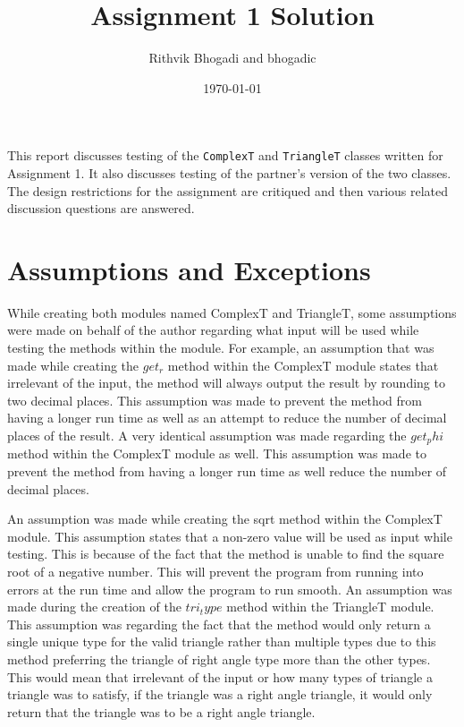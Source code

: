 \documentclass[12pt]{article}
\title{Assignment 1 Solution}
\author{Rithvik Bhogadi and bhogadic}
\date{\today}
\begin{document}
\maketitle

This report discusses testing of the \verb|ComplexT| and \verb|TriangleT|
classes written for Assignment 1. It also discusses testing of the partner's
version of the two classes. The design restrictions for the assignment
are critiqued and then various related discussion questions are answered.

\section{Assumptions and Exceptions} \label{AssumptAndExcept}

While creating both modules named ComplexT and TriangleT, some assumptions were made on behalf of the author regarding what input will be used while testing
the methods within the module. For example, an assumption that was made while creating the $get_r$ method within the ComplexT module states that irrelevant of
the input, the method will always output the result by rounding to two decimal places. This assumption was made to prevent the method from having a longer
run time as well as an attempt to reduce the number of decimal places of the result. A very identical assumption was made regarding the $get_phi$ method
within the ComplexT module as well. This assumption was made to prevent the method from having a longer run time as well reduce the number of decimal places.

An assumption was made while creating the sqrt method within the ComplexT module. This assumption states that a non-zero value will be used as input while
testing. This is because of the fact that the method is unable to find the square root of a negative number. This will prevent the program from running into
errors at the run time and allow the program to run smooth. An assumption was made during the creation of the $tri_type$ method within the TriangleT module.
This assumption was regarding the fact that the method would only return a single unique type for the valid triangle rather than multiple types due to this
method preferring the triangle of right angle type more than the other types. This would mean that irrelevant of the input or how many types of triangle a
triangle was to satisfy, if the triangle was a right angle triangle, it would only return that the triangle was to be a right angle triangle.
\end{document}
